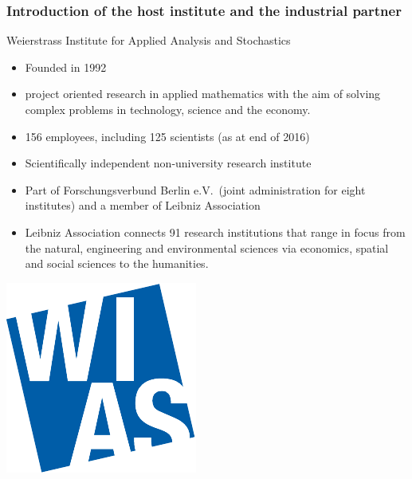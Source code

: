 \documentclass[8pt]{beamer}
\begin{document}
\begin{frame}
  \frametitle{Introduction of the host institute and the industrial
    partner}
  \Large{Weierstrass Institute for Applied Analysis and Stochastics}
        {\small
          \begin{minipage}{\linewidth}
            \begin{minipage}{0.725\linewidth}
              \begin{itemize}
              \item Founded in 1992
              \item project oriented research in applied mathematics
                with the aim of solving complex problems in
                technology, science and the economy.
              \item 156 employees, including 125 scientists (as at end of 2016)
              \item Scientifically independent non-university research institute
              \item Part of Forschungsverbund Berlin e.V.\, (joint
                administration for eight institutes) and a member of
                Leibniz Association
              \item Leibniz Association connects 91 research
                institutions that range in focus from the natural,
                engineering and environmental sciences via economics,
                spatial and social sciences to the humanities.
              \end{itemize}
            \end{minipage}
            \hspace{0.05\linewidth}
            \begin{minipage}{0.2\linewidth}
              \includegraphics[scale=0.45]{wiaslogo-2010.pdf}
            \end{minipage}
          \end{minipage}
        }
\end{frame}
\end{document}
